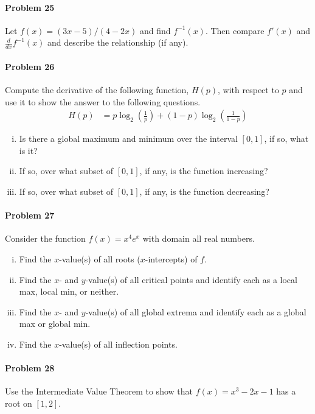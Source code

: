 \documentclass[a4paper, 11pt]{article}
\begin{document}
\paragraph{Problem 25}
Let $f(x) = (3x-5)/(4-2x)$ and find $f^{-1}(x)$.  Then compare $f'(x)$ and $\frac{d}{dx} f^{-1}(x)$ and describe the relationship (if any).


\paragraph{Problem 26}
Compute the derivative of the following function, $H(p)$, with respect to $p$ and use it to show the answer to the following questions.
\begin{align}
    H(p) &= p \log_2 \left(\frac{1}{p} \right) + (1-p)\log_2 \left(\frac{1}{1-p} \right)  \nonumber
\end{align}
\begin{enumerate}[(i)]
	\item Is there a global maximum and minimum over the interval $[0,1]$, if so, what is it?
	\item If so, over what subset of $[0,1]$, if any, is the function increasing?
	\item If so, over what subset of $[0,1]$, if any, is the function decreasing?
\end{enumerate}

\paragraph{Problem 27}
Consider the function $f(x) = x^4 e^x$ with domain all real numbers.
\begin{enumerate}[(i)]
	\item Find the $x$-value(s) of all roots ($x$-intercepts) of $f$.
	\item Find the $x$- and $y$-value(s) of all critical points and identify each as a local max, local min, or neither.
	\item Find the $x$- and $y$-value(s) of all global extrema and identify each as a global max or global min.
	\item Find the $x$-value(s) of all inflection points.
\end{enumerate}

\paragraph{Problem 28}
Use the Intermediate Value Theorem to show that $f(x) = x^3 - 2x - 1$ has a root on $[1,2]$.
\end{document}
